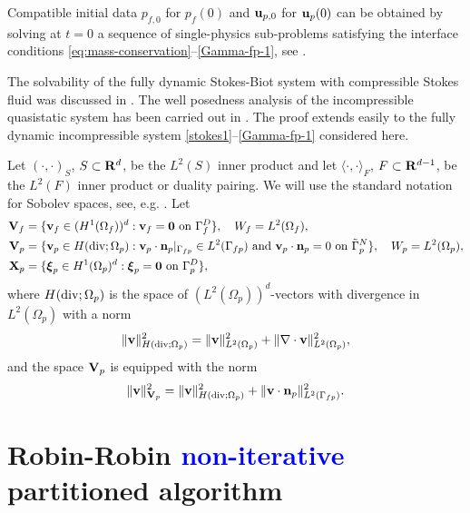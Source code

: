 \documentclass[11pt]{article}
\def\u{{\bf u}}
\def\bv{{\bf v}}
\def\n{{\bf n}}
\def\bxi{\boldsymbol{\xi}}
\def\V{{\bf V}}
\def\X{{\bf X}}
\def\R{{\bf R}}
\def\grad{\nabla}
\def\div{\grad\cdot}
\def\O{\Omega}
\def\<{\langle}
\def\>{\rangle}
\begin{document}
{Compatible initial data $p_{f,0}$ for $p_f(0)$ and $\u_{p,0}$ for $\u_p(0)$ can be obtained by solving at $t = 0$ a sequence of single-physics sub-problems satisfying the interface conditions \eqref{eq:mass-conservation}--\eqref{Gamma-fp-1}, see \cite{aeny2019}.
}


{The solvability of the fully dynamic Stokes-Biot system with compressible Stokes fluid 
was discussed in \cite{s2005}. The well posedness analysis of the incompressible quasistatic system has been carried out in \cite{aeny2019}. The proof extends easily to the fully dynamic incompressible system
\eqref{stokes1}--\eqref{Gamma-fp-1} considered here.}

Let $(\cdot,\cdot)_S$, $S \subset \R^d$, be the
$L^2(S)$ inner product and let $\<\cdot,\cdot\>_F$, $F \subset
\R^{d-1}$, be the $L^2(F)$ inner product or duality pairing. We will
use the standard notation for Sobolev spaces, see, e.g.
\cite{c1978}. Let
%
\begin{align}
\V_{f} &= \{ \bv_f \in (H^1(\O_{f}))^d : \bv_f = \boldsymbol{0} \text{ on }\Gamma_f^D\}, \quad W_{f} = L^2(\O_{f}), \nonumber
\\
\V_{p} &= \{ \bv_p \in H({\rm div}; \O_{p}) : {\bv_p \cdot \n_p|_{\Gamma_{fp}} \in L^2(\Gamma_{fp})}
\text{ and } \bv_p \cdot \n_p = 0 \text{ on } \tilde\Gamma_p^N \}, \quad W_{p} = L^2(\O_{p}), \nonumber
\\
\X_{p} &= \{ \bxi_p \in H^1(\O_{p})^d : \bxi_p= \boldsymbol{0} \text{ on } \Gamma_p^D \}, \label{spaces}
\end{align}
%
where $H({\rm div}; \O_{p})$ is the space of $(L^2(\O_p))^d$-vectors with
divergence in $L^2(\O_p)$ with a norm
%
$$
\|\bv\|_{H({\rm div}; \O_{p})}^2 = \|\bv\|_{L^2(\Omega_p)}^2 + \|\div\bv\|_{L^2(\Omega_p)}^2,
$$
%
and the space $\V_p$ is equipped with the norm
%
\begin{equation}\label{Vp-norm}
{\|\bv\|_{\V_p}^2 = \|\bv\|_{H({\rm div}; \O_{p})}^2 + \|\bv\cdot\n_p\|_{L^2(\Gamma_{fp})}^2.}
\end{equation}

\section{Robin-Robin \textcolor{blue}{non-iterative} partitioned algorithm}\label{sec:RR}
\end{document}
